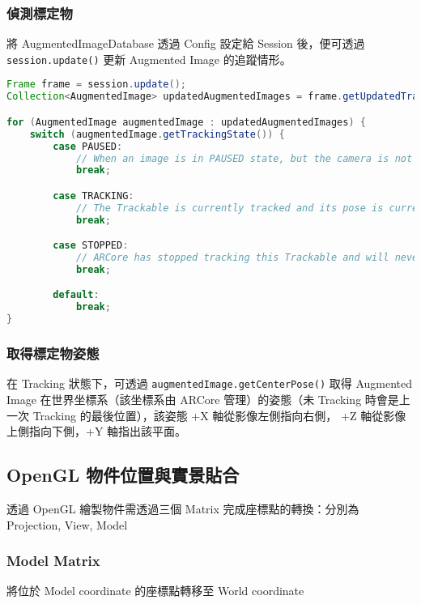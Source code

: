 \subsubsection{偵測標定物}
將 AugmentedImageDatabase 透過 Config 設定給 Session 後，便可透過 \lstinline{session.update()} 更新 Augmented Image 的追蹤情形。

\begin{lstlisting}[language=Java, caption=取得影像追蹤狀態]
Frame frame = session.update();
Collection<AugmentedImage> updatedAugmentedImages = frame.getUpdatedTrackables(AugmentedImage.class);

for (AugmentedImage augmentedImage : updatedAugmentedImages) {
    switch (augmentedImage.getTrackingState()) {
        case PAUSED:
            // When an image is in PAUSED state, but the camera is not PAUSED, it has been detected, but not yet tracked.
            break;

        case TRACKING:
            // The Trackable is currently tracked and its pose is current.
            break;

        case STOPPED:
            // ARCore has stopped tracking this Trackable and will never resume tracking it.
            break;

        default:
            break;
}
\end{lstlisting}

\subsubsection{取得標定物姿態}

在 Tracking 狀態下，可透過 \lstinline{augmentedImage.getCenterPose()} 取得 Augmented Image 在世界坐標系（該坐標系由 ARCore 管理）的姿態（未 Tracking 時會是上一次 Tracking 的最後位置），該姿態 +X 軸從影像左側指向右側， +Z 軸從影像上側指向下側，+Y 軸指出該平面。

\subsection{OpenGL 物件位置與實景貼合}

透過 OpenGL 繪製物件需透過三個 Matrix 完成座標點的轉換：分別為 Projection, View, Model

\subsubsection{Model Matrix}
將位於 Model coordinate 的座標點轉移至 World coordinate

